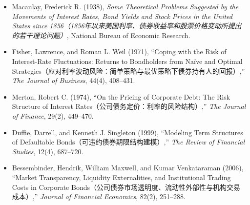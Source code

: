 
\begin{itemize}

\item Macaulay, Frederick R. (1938),
\emph{Some Theoretical Problems Suggested by the Movements of Interest Rates, Bond Yields and Stock Prices in the United States since 1856（1856年以来美国利率、债券收益率和股票价格变动所提出的若干理论问题）},
National Bureau of Economic Research.

\item Fisher, Lawrence, and Roman L. Weil (1971),
``Coping with the Risk of Interest-Rate Fluctuations: Returns to Bondholders from Na\"ive and Optimal Strategies（应对利率波动风险：简单策略与最优策略下债券持有人的回报）,''
\emph{The Journal of Business}, 44(4), 408--431.

\item Merton, Robert C. (1974),
``On the Pricing of Corporate Debt: The Risk Structure of Interest Rates（公司债务定价：利率的风险结构）,''
\emph{The Journal of Finance}, 29(2), 449--470.

\item Duffie, Darrell, and Kenneth J. Singleton (1999),
``Modeling Term Structures of Defaultable Bonds（可违约债券期限结构建模）,''
\emph{The Review of Financial Studies}, 12(4), 687--720.

\item Bessembinder, Hendrik, William Maxwell, and Kumar Venkataraman (2006),
``Market Transparency, Liquidity Externalities, and Institutional Trading Costs in Corporate Bonds（公司债券市场透明度、流动性外部性与机构交易成本）,''
\emph{Journal of Financial Economics}, 82(2), 251--288.

\end{itemize}

